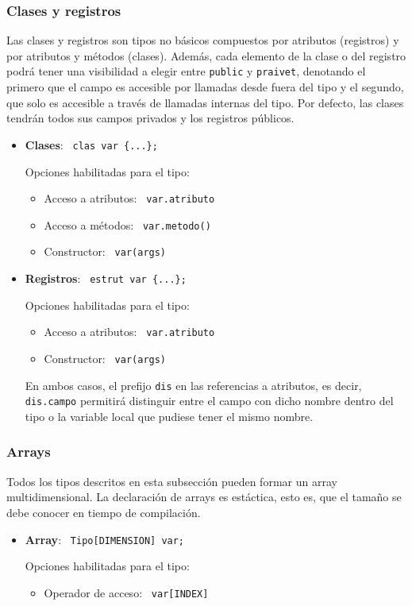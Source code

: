\documentclass[10pt,a4paper]{article}
\begin{document}
\subsubsection{Clases y registros}
Las clases y registros son tipos no básicos compuestos por atributos (registros) y por atributos y métodos (clases). Además, cada elemento de la clase o del registro podrá tener una visibilidad a elegir entre \texttt{\color{blue}public} y \texttt{\color{blue}praivet}, denotando el primero que el campo es accesible por llamadas desde fuera del tipo y el segundo, que solo es accesible a través de llamadas internas del tipo. Por defecto, las clases tendrán todos sus campos privados y los registros públicos.

\begin{itemize}
    \item \textbf{Clases}: \texttt{\color{blue} clas var \{...\};}
    
    Opciones habilitadas para el tipo:
    \begin{itemize}
        \item Acceso a atributos: \texttt{\color{blue} var.atributo}
        \item Acceso a métodos: \texttt{\color{blue} var.metodo()}
        \item Constructor: \texttt{\color{blue} var(args)}
    \end{itemize}
    \item \textbf{Registros}: \texttt{\color{blue} estrut var \{...\};}
    
    Opciones habilitadas para el tipo:
    \begin{itemize}
        \item Acceso a atributos: \texttt{\color{blue} var.atributo}
        \item Constructor: \texttt{\color{blue} var(args)}
    \end{itemize}

    En ambos casos, el prefijo \texttt{\color{blue}dis} en las referencias a atributos, es decir, \texttt{\color{blue}dis.campo} permitirá distinguir entre el campo con dicho nombre dentro del tipo o la variable local que pudiese tener el mismo nombre.
\end{itemize}


\subsubsection{Arrays}
Todos los tipos descritos en esta subsección pueden formar un array multidimensional. La declaración de arrays es estáctica, esto es, que el tamaño se debe conocer en tiempo de compilación. 
\begin{itemize}
    \item \textbf{Array}: \texttt{\color{blue} Tipo[DIMENSION] var;}
    
    Opciones habilitadas para el tipo:
    \begin{itemize}
        \item Operador de acceso: \texttt{\color{blue} var[INDEX]}
    \end{itemize}
\end{itemize}
\end{document}

